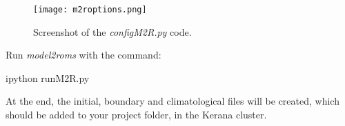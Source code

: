 \begin{figure}[H]
    \centering
    \texttt{[image: m2roptions.png]}
    \caption{Screenshot of the \textit{configM2R.py} code.}
    \label{m2roptions}
\end{figure}
\bigskip

\noindent Run \textit{model2roms} with the command:
\bigskip

\begin{bashcode}
ipython runM2R.py
\end{bashcode}
\bigskip

\noindent At the end, the initial, boundary and climatological files will be created, which should be added to your project folder, in the Kerana cluster.
\bigskip
   

